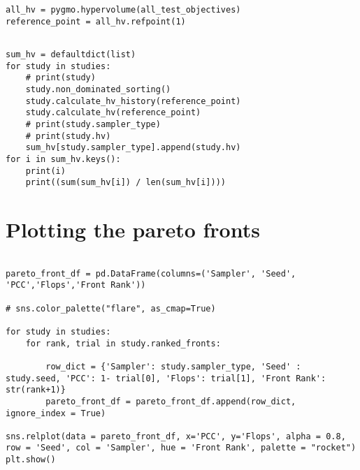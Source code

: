\documentclass[11pt]{article}
\begin{document}
\begin{verbatim}
all_hv = pygmo.hypervolume(all_test_objectives)
reference_point = all_hv.refpoint(1)
\end{verbatim}

\begin{verbatim}

sum_hv = defaultdict(list)
for study in studies:
    # print(study)
    study.non_dominated_sorting()
    study.calculate_hv_history(reference_point)
    study.calculate_hv(reference_point)
    # print(study.sampler_type)
    # print(study.hv)
    sum_hv[study.sampler_type].append(study.hv)
for i in sum_hv.keys():
    print(i)
    print((sum(sum_hv[i]) / len(sum_hv[i])))
\end{verbatim}

\section{Plotting the pareto fronts}
\label{sec:org0fc82e1}
\begin{verbatim}

pareto_front_df = pd.DataFrame(columns=('Sampler', 'Seed', 'PCC','Flops','Front Rank'))

# sns.color_palette("flare", as_cmap=True)

for study in studies:
    for rank, trial in study.ranked_fronts:

        row_dict = {'Sampler': study.sampler_type, 'Seed' : study.seed, 'PCC': 1- trial[0], 'Flops': trial[1], 'Front Rank': str(rank+1)}
        pareto_front_df = pareto_front_df.append(row_dict, ignore_index = True)

sns.relplot(data = pareto_front_df, x='PCC', y='Flops', alpha = 0.8, row = 'Seed', col = 'Sampler', hue = 'Front Rank', palette = "rocket")
plt.show()


\end{verbatim}
\end{document}
